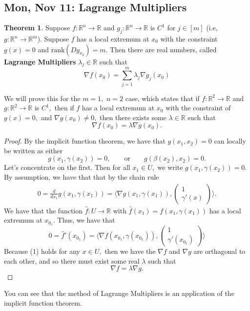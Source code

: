 \documentclass[10pt, oneside]{article}
\newcommand{\bbR}{\mathbb{R}}
\theoremstyle{definition}
\newtheorem{thm}{Theorem}
\begin{document}
\subsection{Mon, Nov 11: Lagrange Multipliers}
\begin{thm}
    Suppose $f: \bbR^n \to \bbR$ and $g_j: \bbR^n \to \bbR$ is $C^1$ for $j \in [m]$ (i.e, $g: \bbR^n \to \bbR^m$). Suppose $f$ has a local extremum at $x_0$ with the constraint $g(x) =0$ and $\text{rank}(Dg_{x_0}) = m.$ Then there are real numbers, called \textbf{Lagrange Multipliers} $\lambda_j \in \bbR$ such that 
    \[\nabla f(x_0) = \sum_{j=1}^m \lambda_j \nabla g_j(x_0)\]
\end{thm}
We will prove this for the $m = 1,$ $n=2$ case, which states that if $f: \bbR^2 \to \bbR$ and $g: \bbR^2 \to \bbR$ is $C^1,$ then if $f$ has a local extremum at $x_0$ with the constraint of $g(x) = 0,$ and $\nabla g(x_0) \neq 0,$ then there exists some $\lambda \in \bbR$ such that 
\[\nabla f(x_0) = \lambda \nabla g(x_0).\]
\begin{proof}
    By the implicit function theorem, we have that $g(x_1, x_2) = 0$ can locally be written as either 
    \[g(x_1, \gamma(x_2)) =0, \qquad \text{or}\qquad g(\beta(x_2), x_2) = 0.\] Let's concentrate on the first. Then for all $x_1 \in U,$ we write $g(x_1, \gamma(x_2)) = 0.$ By assumption, we have that that by the chain rule
    \begin{align}
        0 = \frac{d}{dx_1}g(x_1, \gamma(x_1)) = \langle 
    \nabla g(x_1, \gamma(x_1)), \begin{pmatrix}
        1 \\ \gamma'(x)
    \end{pmatrix}
    \rangle.
    \end{align} We have that the function $\hat{f}: U \to \bbR$ with $\hat{f}(x_1) = f(x_1, \gamma(x_1))$ has a local extremum at $x_{0_1}.$ Thus, we have that 
    \[0 = \hat{f}'(x_{0_{1}}) = \langle \nabla f(x_{0_1}, \gamma(x_{0_1})), \begin{pmatrix}
        1 \\ \gamma'(x_{0_1})
    \end{pmatrix}\rangle\] Because (1) holds for any $x\in U,$ then we have the $\nabla f$ and $\nabla g$ are orthagonal to each other, and so there must exist some real $\lambda$ such that 
    \[\nabla f = \lambda \nabla g.\]
\end{proof}
You can see that the method of Lagrange Multipliers is an application of the implicit function theorem.
\end{document}
